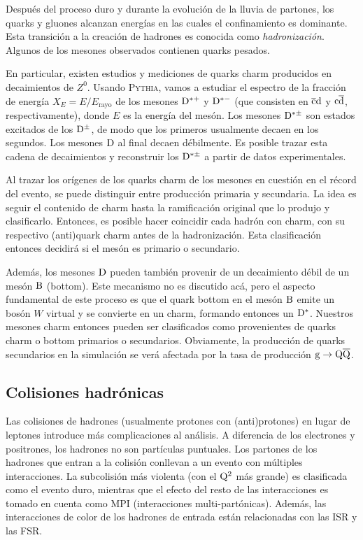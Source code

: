 \documentclass[a4paper,12pt]{article}
\begin{document}
Después del proceso duro y durante la evolución de la lluvia de partones, los quarks y gluones alcanzan energías en las cuales el confinamiento es dominante. Esta transición a la creación de hadrones es conocida como \textit{hadronización}. Algunos de los mesones observados contienen quarks pesados.

En particular, existen estudios y mediciones de quarks charm producidos en decaimientos de $Z^0$\cite{Barate:1999bg}. Usando \textsc{Pythia}, vamos a estudiar el espectro de la fracción de energía $X_E=E/E_{\mbox{rayo}}$ de los mesones ${\mathrm D}^{*+}$ y ${\mathrm D}^{*-}$ (que consisten en $\overline{\mathrm c}{\mathrm d}$ y ${\mathrm c}\overline{\mathrm d}$, respectivamente), donde $E$ es la energía del mesón. Los mesones ${\mathrm D}^{*\pm}$ son estados excitados de los ${\mathrm D}^{\pm}$, de modo que los primeros usualmente decaen en los segundos. Los mesones ${\mathrm D}$ al final decaen débilmente. Es posible trazar esta cadena de decaimientos y reconstruir los ${\mathrm D}^{*\pm}$ a partir de datos experimentales.

Al trazar los orígenes de los quarks charm de los mesones en cuestión en el récord del evento, se puede distinguir entre producción primaria y secundaria. La idea es seguir el contenido de charm hasta la ramificación original que lo produjo y clasificarlo. Entonces, es posible hacer coincidir cada hadrón con charm, con su respectivo (anti)quark charm antes de la hadronización. Esta clasificación entonces decidirá si el mesón es primario o secundario.

Además, los mesones ${\mathrm D}$ pueden también provenir de un decaimiento débil de un mesón ${\mathrm B}$ (bottom). Este mecanismo no es discutido acá, pero el aspecto fundamental de este proceso es que el quark bottom en el mesón ${\mathrm B}$ emite un bosón $W$ virtual y se convierte en un charm, formando entonces un ${\mathrm D}^*$. Nuestros mesones charm entonces pueden ser clasificados como provenientes de quarks charm o bottom primarios o secundarios. Obviamente, la producción de quarks secundarios en la simulación se verá afectada por la tasa de producción ${\mathrm g}\to{\mathrm Q}\overline{\mathrm Q}$.

\subsection{Colisiones hadrónicas}

Las colisiones de hadrones (usualmente protones con (anti)protones) en lugar de leptones introduce más complicaciones al análisis. A diferencia de los electrones y positrones, los hadrones no son partículas puntuales. Los partones de los hadrones que entran a la colisión conllevan a un evento con múltiples interacciones. La subcolisión más violenta (con el ${\mathrm Q}^2$ más grande) es clasificada como el evento duro, mientras que el efecto del resto de las interacciones es tomado en cuenta como MPI (interacciones multi-partónicas). Además, las interacciones de color de los hadrones de entrada están relacionadas con las ISR y las FSR. 
\end{document}
